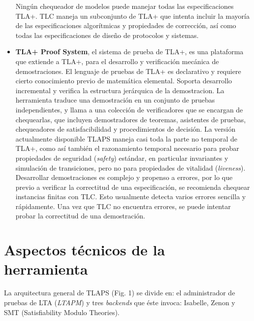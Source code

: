 \documentclass[spanish]{llncs}
\begin{document}
\begin{itemize}
	  Ningún chequeador de modelos puede manejar todas las especificaciones TLA+. TLC maneja un subconjunto de TLA+ que intenta incluir la mayoría de las especificaciones algorítmicas y propiedades de corrección, así como todas las especificaciones de diseño de protocolos y sistemas.
    \item \textbf{TLA+ Proof System}, el sistema de prueba de TLA+, es una plataforma que extiende a TLA+, para el desarrollo y verificación mecánica de demostraciones. 
	  El lenguaje de pruebas de TLA+ es declarativo y requiere cierto conocimiento previo de matemática elemental. Soporta desarrollo incremental y verifica la estructura jerárquica de la demostracion.
	  La herramienta traduce una demostración en un conjunto de pruebas independientes, y llama a una colección de verificadores que se encargan de chequearlas, 
	  que incluyen demostradores de teoremas, asistentes de pruebas, chequeadores de satisfacibilidad y procedimientos de decisión.
	  La versión actualmente disponible TLAPS maneja casi toda la parte no temporal de TLA+, como así también el razonamiento temporal necesario para probar propiedades de seguridad (\textit{safety}) estándar, en particular invariantes y simulación de transiciones, pero no para propiedades de vitalidad (\textit{liveness}).
	  Desarrollar demostraciones es complejo y propenso a errores, por lo que previo a verificar la correctitud de una especificación,
	  se recomienda chequear instancias finitas con TLC. Esto usualmente detecta varios errores sencilla y rápidamente. 
	  Una vez que TLC no encuentra errores, se puede intentar probar la correctitud de una demostración. 
  \end{itemize}  

\section{Aspectos técnicos de la herramienta}
La arquitectura general de TLAPS (Fig. 1) se divide en: el administrador de pruebas de LTA (\textit{LTAPM}) y tres \textit{backends} que éste invoca: Isabelle, Zenon y SMT (Satisfiability Modulo Theories).
\end{document}
